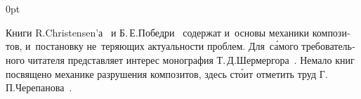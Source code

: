\section*{\small \wordforbibliography}

\begin{changemargin}{\parindent}{0pt}
\fontsize{10}{12}\selectfont

\begin{otherlanguage}{russian}

Книги R.\:Christensen’а~\cite{christensen-compositematerials} и Б.\,Е.\:Победри~\cite{pobedrya-composites} содержат и~основы механики композитов, и~постановку не~теряющих актуальности проблем. Для~с\'{а}мого требовательного читателя представляет интерес монография Т.\,Д.\:Шермергора~\cite{shermergor}. Немало книг посвящено механике разрушения композитов, здесь ст\'{о}ит отметить труд Г.\,П.\:Черепанова~\cite{cherepanov-compositematerialfracture}.

\end{otherlanguage}

\end{changemargin}
